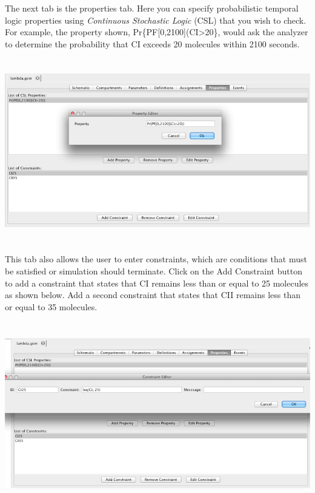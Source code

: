 \documentclass[titlepage,11pt]{article}
\begin{document}
The next tab is the properties tab.  Here you can specify probabilistic temporal logic properties using \emph{Continuous Stochastic Logic} (CSL) that you wish to check.  For example, the property shown,
Pr\{PF[0,2100](CI>20\}, would ask the analyzer to determine the probability that CI exceeds 20 molecules within 2100 seconds.

\begin{center}
\includegraphics[height=80mm]{screenshots/properties}
\end{center}

This tab also allows the user to enter constraints, which are conditions that must be satisfied or simulation should terminate.  Click on the Add Constraint button to add a constraint that states that CI remains less than or equal to 25 molecules as shown below.  Add a second constraint that states that CII remains less than or equal to 35 molecules.

\begin{center}
\includegraphics[height=80mm]{screenshots/constraint}
\end{center}
\end{document}
